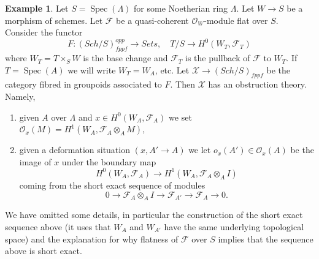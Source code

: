 \documentclass{stacks-project}
\theoremstyle{plain}
\theoremstyle{definition}
\newtheorem{example}[subsection]{Example}
\theoremstyle{remark}
\numberwithin{equation}{subsection}
\def\Spec{\mathop{\mathrm{Spec}}}
\def\Sch{\mathit{Sch}}
\begin{document}
\begin{example}
\label{example-global-sections}
Let $S = \Spec(\Lambda)$ for some Noetherian ring $\Lambda$.
Let $W \to S$ be a morphism of schemes. Let $\mathcal{F}$
be a quasi-coherent $\mathcal{O}_W$-module flat over $S$.
Consider the functor
$$
F : (\Sch/S)_{fppf}^{opp} \longrightarrow \textit{Sets},
\quad
T/S \longrightarrow H^0(W_T, \mathcal{F}_T)
$$
where $W_T = T \times_S W$ is the base change and $\mathcal{F}_T$ is
the pullback of $\mathcal{F}$ to $W_T$. If $T = \Spec(A)$
we will write $W_T = W_A$, etc. Let $\mathcal{X} \to (\Sch/S)_{fppf}$
be the category fibred in groupoids associated to $F$. Then
$\mathcal{X}$ has an obstruction theory. Namely,
\begin{enumerate}
\item given $A$ over $\Lambda$ and
$x \in H^0(W_A, \mathcal{F}_A)$ we set
$\mathcal{O}_x(M) = H^1(W_A, \mathcal{F}_A \otimes_A M)$,
\item given a deformation situation $(x, A' \to A)$ we let
$o_x(A') \in \mathcal{O}_x(A)$ be the image of $x$ under the boundary map
$$
H^0(W_A, \mathcal{F}_A) \longrightarrow H^1(W_A, \mathcal{F}_A \otimes_A I)
$$
coming from the short exact sequence of modules
$$
0 \to \mathcal{F}_A \otimes_A I \to
\mathcal{F}_{A'} \to \mathcal{F}_A \to 0.
$$
\end{enumerate}
We have omitted some details, in particular the construction of the short
exact sequence above (it uses that $W_A$ and $W_{A'}$ have the same
underlying topological space) and the explanation for why flatness
of $\mathcal{F}$ over $S$ implies that the sequence above is short exact.
\end{example}
\end{document}
